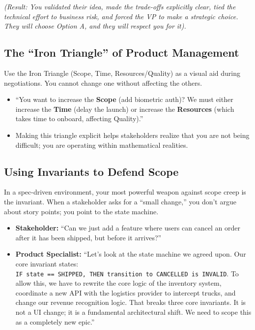 \documentclass[
  11pt,
  openany,
  oneside]{book}
\providecommand{\tightlist}{%
  \setlength{\itemsep}{0pt}\setlength{\parskip}{0pt}}
\begin{document}
\emph{(Result: You validated their idea, made the trade-offs explicitly
clear, tied the technical effort to business risk, and forced the VP to
make a strategic choice. They will choose Option A, and they will
respect you for it).}

\subsection{The ``Iron Triangle'' of Product
Management}\label{the-iron-triangle-of-product-management}

Use the Iron Triangle (Scope, Time, Resources/Quality) as a visual aid
during negotiations. You cannot change one without affecting the others.

\begin{itemize}
\tightlist
\item
  ``You want to increase the \textbf{Scope} (add biometric auth)? We
  must either increase the \textbf{Time} (delay the launch) or increase
  the \textbf{Resources} (which takes time to onboard, affecting
  Quality).''
\item
  Making this triangle explicit helps stakeholders realize that you are
  not being difficult; you are operating within mathematical realities.
\end{itemize}

\subsection{Using Invariants to Defend
Scope}\label{using-invariants-to-defend-scope}

In a spec-driven environment, your most powerful weapon against scope
creep is the invariant. When a stakeholder asks for a ``small change,''
you don't argue about story points; you point to the state machine.

\begin{itemize}
\tightlist
\item
  \textbf{Stakeholder:} ``Can we just add a feature where users can
  cancel an order after it has been shipped, but before it arrives?''
\item
  \textbf{Product Specialist:} ``Let's look at the state machine we
  agreed upon. Our core invariant states:
  \texttt{IF\ state\ ==\ SHIPPED,\ THEN\ transition\ to\ CANCELLED\ is\ INVALID}.
  To allow this, we have to rewrite the core logic of the inventory
  system, coordinate a new API with the logistics provider to intercept
  trucks, and change our revenue recognition logic. That breaks three
  core invariants. It is not a UI change; it is a fundamental
  architectural shift. We need to scope this as a completely new epic.''
\end{itemize}
\end{document}
